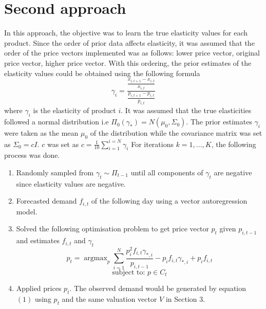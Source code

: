 \documentclass[a4paper]{article}
\DeclareMathOperator*{\argmax}{argmax}
\begin{document}
\section{Second approach}
In this approach, the objective was to learn the true elasticity values for each product. Since the order of prior data affects elasticity, it was assumed that the order of the price vectors implemented was as follows: lower price vector, original price vector, higher price vector. With this ordering, the prior estimates of the elasticity values could be obtained using the following formula
\[\gamma_i = \frac{\frac{x_{i,t+1}-x_{i,t}}{x_{i,t}}}{\frac{p_{i,t+1}-p_{i,t}}{p_{i,t}}}\]
where $\gamma_i$ is the elasticity of product $i$. It was assumed that the true elasticities followed a normal distribution i.e $\Pi_0(\gamma_*)=N(\mu_0,\Sigma_0)$. The prior estimates $\gamma_i$ were taken as the mean $\mu_0$ of the distribution while the covariance matrix was set as $\Sigma_0 = cI$. $c$ was set as $c = \frac{1}{10}\sum_{i=1}^{i=N}\gamma_i$
\newline
\newline
For iterations $k = 1,...,K$, the following process was done. 
\begin{enumerate}
	\item Randomly sampled from $\gamma_t \sim \Pi_{t-1}$ until all components of $\gamma_t$ are negative since elasticity values are negative.
	\item Forecasted demand $f_{i,t}$ of the following day using a vector autoregression model.
	\item Solved the following optimisation problem to get price vector $p_t$ given $p_{i,t-1}$ and estimates $f_{i,t}$ and $\gamma_t$ \[p_t = \argmax_p \sum_{i=1}^{N}\frac{p_i^2f_{i,t}\gamma_{*,i}}{p_{i,t-1}} -p_if_{i,t}\gamma_{*,i} + p_if_{i,t}\] \[\text{subject to: } p \in C_t \]
	\item Applied prices $p_t$. The observed demand would be generated by equation $(1)$ using $p_t$ and the same valuation vector $V$ in Section 3.
\end{enumerate}
\end{document}
